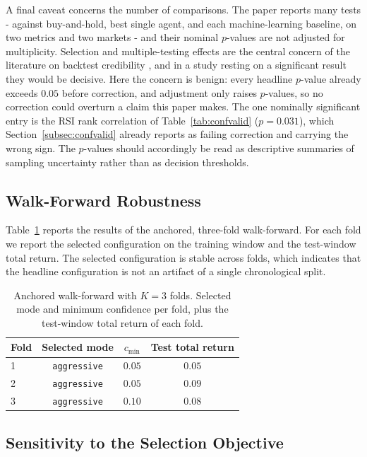 \documentclass{ieeeaccess}
\begin{document}
A final caveat concerns the number of comparisons. The paper reports many tests - against buy-and-hold, best single agent, and each machine-learning baseline, on two metrics and two markets - and their nominal $p$-values are not adjusted for multiplicity. Selection and multiple-testing effects are the central concern of the literature on backtest credibility \cite{harvey2016,bailey2014}, and in a study resting on a significant result they would be decisive. Here the concern is benign: every headline $p$-value already exceeds $0.05$ before correction, and adjustment only raises $p$-values, so no correction could overturn a claim this paper makes. The one nominally significant entry is the RSI rank correlation of Table~\ref{tab:confvalid} ($p = 0.031$), which Section~\ref{subsec:confvalid} already reports as failing correction and carrying the wrong sign. The $p$-values should accordingly be read as descriptive summaries of sampling uncertainty rather than as decision thresholds.

\subsection{Walk-Forward Robustness}
\label{subsec:kfold}

Table~\ref{tab:kfold} reports the results of the anchored, three-fold walk-forward. For each fold we report the selected configuration on the training window and the test-window total return. The selected configuration is stable across folds, which indicates that the headline configuration is not an artifact of a single chronological split.

\begin{table}[t]
\centering
\caption{Anchored walk-forward with $K = 3$ folds. Selected mode and minimum confidence per fold, plus the test-window total return of each fold.}
\label{tab:kfold}
\begin{tabular}{lccc}
\toprule
Fold & Selected mode & $c_{\min}$ & Test total return \\
\midrule
1 & \texttt{aggressive} & $0.05$ & $0.05$ \\
2 & \texttt{aggressive} & $0.05$ & $0.09$ \\
3 & \texttt{aggressive} & $0.10$ & $0.08$ \\
\bottomrule
\end{tabular}
\end{table}

\subsection{Sensitivity to the Selection Objective}
\label{subsec:objective}
\end{document}
